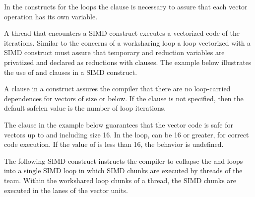 In the  constructs for the loops the  clause is 
necessary to assure that each vector operation has its own 
variable.



{}
A thread that encounters a SIMD construct executes a vectorized code of the 
iterations. Similar to the concerns of a worksharing loop a loop vectorized 
with a SIMD construct must assure that temporary and reduction variables are 
privatized and declared as reductions with clauses.  The example below 
illustrates the use of  and  clauses in a SIMD 
construct.




{}
A  clause in a  construct assures the compiler that 
there are no loop-carried dependences for vectors of size  or below. If
the  clause is not specified, then the default safelen value is 
the number of loop iterations.
 
The  clause in the example below guarantees that the vector 
code is safe for vectors up to and including size 16.  In the loop,  can 
be 16 or greater, for correct code execution.  If the value of  is less 
than 16, the behavior is undefined.



{}
The following SIMD construct instructs the compiler to collapse the  and 
 loops into a single SIMD loop in which SIMD chunks are executed by 
threads of the team. Within the workshared loop chunks of a thread, the SIMD 
chunks are executed in the lanes of the vector units.




